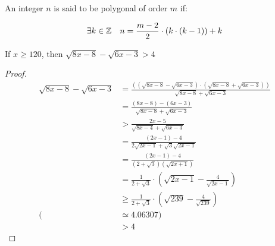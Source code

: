 %

\begin{definition}
    \label{def:Polygonal}
    \leanok
    An integer $n$ is said to be polygonal of order $m$ if:

    \[
        \exists k \in \mathbb{Z} \quad n = \frac{m-2}{2}\cdot (k \cdot (k-1)) + k
    \]
\end{definition}

%
%

\begin{lemma}
    \label{lem:x120bound}
    If $x\geq 120$, then $\sqrt{8x-8}-\sqrt{6x-3}>4$
\end{lemma}

\begin{proof}
    \begin{align}
        \sqrt{8x-8}-\sqrt{6x-3} &= \frac{((\sqrt{8x-8}-\sqrt{6x-3})\cdot (\sqrt{8x-8}+\sqrt{6x-3}))}{\sqrt{8x-8}+\sqrt{6x-3}} \\
        &= \frac{(8x-8)-(6x-3)}{\sqrt{8x-8}+\sqrt{6x-3}} \\
        &> \frac{2x-5}{\sqrt{8x-4}+\sqrt{6x-3}} \\
        &= \frac{(2x-1)-4}{2\sqrt{2x-1}+\sqrt{3}\sqrt{2x-1}} \\
        &= \frac{(2x-1)-4}{(2+\sqrt{3})(\sqrt{2x+1})} \\
        &= \frac{1}{2+\sqrt{3}}\cdot \left(\sqrt{2x-1} - \frac{4}{\sqrt{2x-1}}\right) \\
        &\geq \frac{1}{2+\sqrt{3}}\cdot \left(\sqrt{239} - \frac{4}{\sqrt{239}}\right) \\
        (&\simeq 4.06307)\\
        &>4
    \end{align} 
\end{proof}

%
%

